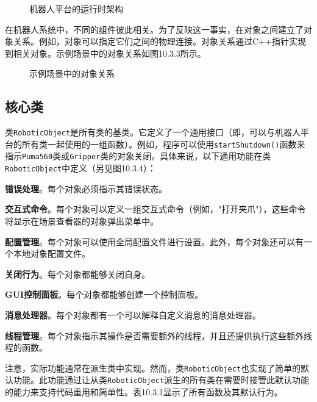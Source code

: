 \documentclass[UTF8,a4paper,12pt]{ctexart}
\begin{document}
\begin{figure}[htbp]
\centering
{}
\caption{机器人平台的运行时架构}
\label{fig:10.3.2}
\end{figure}

在机器人系统中，不同的组件彼此相关。为了反映这一事实，在对象之间建立了对象关系。例如，对象可以指定它们之间的物理连接。对象关系通过C++指针实现到相关对象。示例场景中的对象关系如图10.3.3所示。

\begin{figure}[htbp]
\centering
{}
\caption{示例场景中的对象关系}
\label{fig:10.3.3}
\end{figure}

\subsection{核心类}

类\texttt{RoboticObject}是所有类的基类。它定义了一个通用接口（即，可以与机器人平台的所有类一起使用的一组函数）。例如，程序可以使用\texttt{startShutdown()}函数来指示\texttt{Puma560}类或\texttt{Gripper}类的对象关闭。具体来说，以下通用功能在类\texttt{RoboticObject}中定义（另见图10.3.4）：

\textbf{错误处理}。每个对象必须指示其错误状态。

\textbf{交互式命令}。每个对象可以定义一组交互式命令（例如，"打开夹爪"），这些命令将显示在场景查看器的对象弹出菜单中。

\textbf{配置管理}。每个对象可以使用全局配置文件进行设置。此外，每个对象还可以有一个本地对象配置文件。

\textbf{关闭行为}。每个对象都能够关闭自身。

\textbf{GUI控制面板}。每个对象都能够创建一个控制面板。

\textbf{消息处理器}。每个对象都有一个可以解释自定义消息的消息处理器。

\textbf{线程管理}。每个对象指示其操作是否需要额外的线程，并且还提供执行这些额外线程的函数。

注意，实际功能通常在派生类中实现。然而，类\texttt{RoboticObject}也实现了简单的默认功能。此功能通过让从类\texttt{RoboticObject}派生的所有类在需要时接管此默认功能的能力来支持代码重用和简单性。表10.3.1显示了所有函数及其默认行为。
\end{document}
